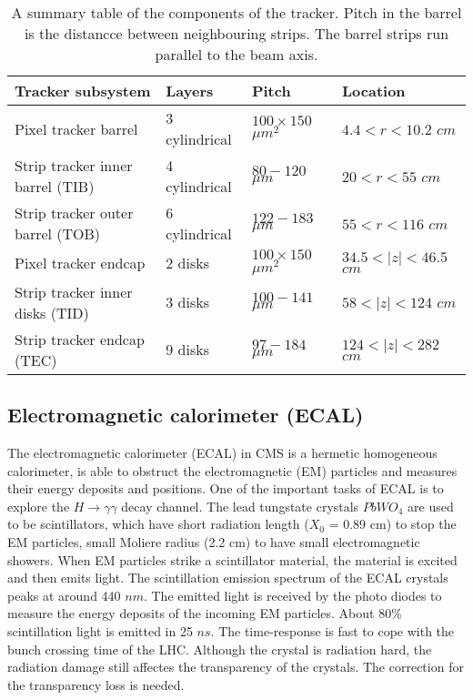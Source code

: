 \begin{table}[t]
\caption{A summary table of the components of the tracker. Pitch in the barrel is the distancce between neighbouring strips. The barrel strips run parallel to the beam axis.}
\centering
\small
\begin{tabular*}{\textwidth}{llll}
\hline
Tracker subsystem&Layers&Pitch&Location\\
\hline
Pixel tracker barrel&3 cylindrical& $100 \times 150$ $\mu m^{2} $ & $4.4<r<10.2$ $cm$\\
Strip tracker inner barrel (TIB)&4 cylindrical& $80-120$ $\mu m $ & $20 < r < 55$ $cm$\\
Strip tracker outer barrel (TOB)&6 cylindrical& $122-183$ $\mu m $ & $55 < r < 116$ $cm$\\
\hline
Pixel tracker endcap&2 disks& $100 \times 150$ $\mu m^{2} $ & $34.5 < \vert z \vert < 46.5$ $cm$\\
Strip tracker inner disks (TID)&3 disks& $100-141$ $\mu m $ & $58 < \vert z \vert < 124$ $cm$\\
Strip tracker endcap (TEC)&9 disks& $97-184$ $\mu m $ & $124 < \vert z \vert < 282$ $cm$\\
\hline
\end{tabular*}
\label{tab:TrackerLayout}
\end{table}

\subsection{Electromagnetic calorimeter (ECAL)}

The electromagnetic calorimeter (ECAL) in CMS is a hermetic homogeneous calorimeter, is able to obstruct the electromagnetic (EM) particles and measures their energy deposits and positions.
One of the important tasks of ECAL is to explore the $H\rightarrow\gamma\gamma$ decay channel.
The lead tungstate crystals $PbWO_{4}$ are used to be scintillators, which have short radiation length ($X_{0}$ = 0.89 cm) to stop the EM particles, small Moliere radius (2.2 cm) to have small electromagnetic showers.
When EM particles strike a scintillator material, the material is excited and then emits light.
The scintillation emission spectrum of the ECAL crystals peaks at around 440 $nm$. The emitted light is received by the photo diodes to measure the energy deposits of the incoming EM particles.
About 80\% scintillation light is emitted in 25 $ns$. The time-response is fast to cope with the bunch crossing time of the LHC.
Although the crystal is radiation hard, the radiation damage still affectes the transparency of the crystals. The correction for the transparency loss is needed. ~\cite{1742-6596-587-1-012001}

